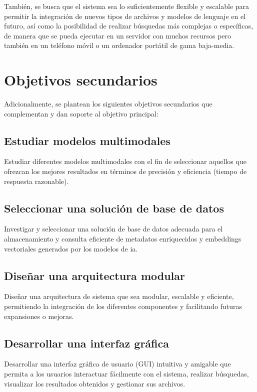 También, se busca que el sistema sea lo suficientemente flexible y escalable para permitir la integración de nuevos tipos de archivos y modelos de lenguaje en el futuro, así como la posibilidad de realizar búsquedas más complejas o específicas, de manera que se pueda ejecutar en un servidor con muchos recursos pero también en un teléfono móvil o un ordenador portátil de gama baja-media.

\section{Objetivos secundarios}
Adicionalmente, se plantean los siguientes objetivos secundarios que complementan y dan soporte al objetivo principal:
\subsection{Estudiar modelos multimodales}
Estudiar diferentes modelos multimodales con el fin de seleccionar aquellos que ofrezcan los mejores resultados en términos de precisión y eficiencia (tiempo de respuesta razonable).
\subsection{Seleccionar una solución de base de datos}
Investigar y seleccionar una solución de base de datos adecuada para el almacenamiento y consulta eficiente de metadatos enriquecidos y embeddings vectoriales generados por los modelos de \gls{ia}.
\subsection{Diseñar una arquitectura modular}
Diseñar una arquitectura de sistema que sea modular, escalable y eficiente, permitiendo la integración de los diferentes componentes y facilitando futuras expansiones o mejoras.
\subsection{Desarrollar una interfaz gráfica}
Desarrollar una interfaz gráfica de usuario (GUI) intuitiva y amigable que permita a los usuarios interactuar fácilmente con el sistema, realizar búsquedas, visualizar los resultados obtenidos y gestionar sus archivos.
